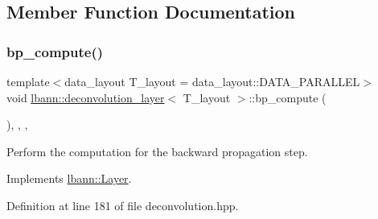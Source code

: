\subsection{Member Function Documentation}
\mbox{\label{classlbann_1_1deconvolution__layer_a70649662ff27ddacf0f5584829022b72}} 
\subsubsection{\texorpdfstring{bp\+\_\+compute()}{bp\_compute()}}
{\footnotesize\ttfamily template$<$data\+\_\+layout T\+\_\+layout = data\+\_\+layout\+::\+D\+A\+T\+A\+\_\+\+P\+A\+R\+A\+L\+L\+EL$>$ \\
void \hyperlink{classlbann_1_1deconvolution__layer}{lbann\+::deconvolution\+\_\+layer}$<$ T\+\_\+layout $>$\+::bp\+\_\+compute (\begin{DoxyParamCaption}{ }\end{DoxyParamCaption})\hspace{0.3cm}{\ttfamily [inline]}, {\ttfamily [override]}, {\ttfamily [protected]}, {\ttfamily [virtual]}}

Perform the computation for the backward propagation step. 

Implements \hyperlink{classlbann_1_1Layer_a7442e01f9ee1294df2de811efcf5171e}{lbann\+::\+Layer}.



Definition at line 181 of file deconvolution.\+hpp.


